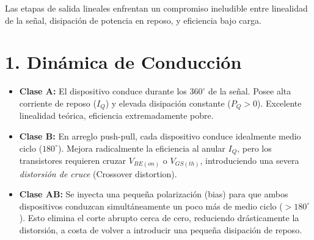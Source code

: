 \documentclass[11pt, a4paper]{article}
\begin{document}
\begin{tcolorbox}[colback=ucbblue!5, colframe=ucbblue, title=\textbf{Concepto Puente: Tradeoff de Etapas Lineales y Motivación de Switching}]
    Las etapas de salida lineales enfrentan un compromiso ineludible entre linealidad de la señal, disipación de potencia en reposo, y eficiencia bajo carga.
\end{tcolorbox}

\section*{1. Dinámica de Conducción}

\begin{itemize}
    \item \textbf{Clase A:} El dispositivo conduce durante los $360^\circ$ de la señal. Posee alta corriente de reposo ($I_Q$) y elevada disipación constante ($P_Q > 0$). Excelente linealidad teórica, eficiencia extremadamente pobre.
    \item \textbf{Clase B:} En arreglo push-pull, cada dispositivo conduce idealmente medio ciclo ($180^\circ$). Mejora radicalmente la eficiencia al anular $I_Q$, pero los transistores requieren cruzar $V_{BE(on)}$ o $V_{GS(th)}$, introduciendo una severa \textit{distorsión de cruce} (Crossover distortion).
    \item \textbf{Clase AB:} Se inyecta una pequeña polarización (bias) para que ambos dispositivos conduzcan simultáneamente un poco más de medio ciclo ($>180^\circ$). Esto elimina el corte abrupto cerca de cero, reduciendo drásticamente la distorsión, a costa de volver a introducir una pequeña disipación de reposo.
\end{itemize}

\begin{center}
\end{center}
\end{document}
